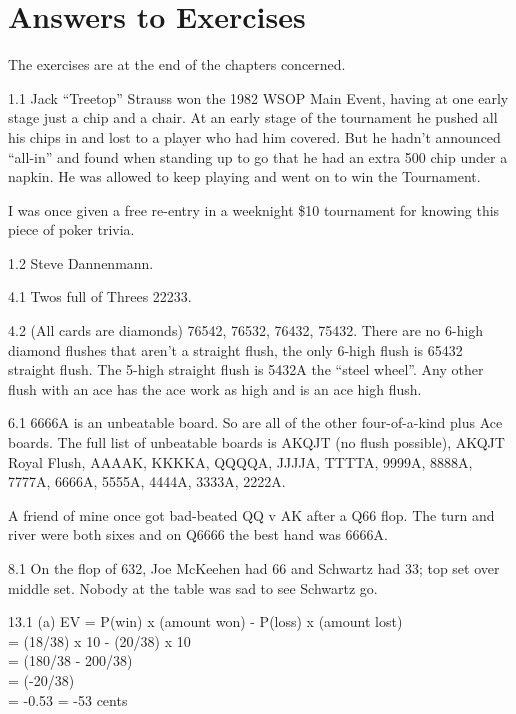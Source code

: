 \chapter{Answers to Exercises}

The exercises are at the end of the chapters concerned.


1.1 Jack ``Treetop'' Strauss won the 1982 WSOP Main Event,
having at one early stage just a chip and a chair. At an early
stage of the tournament he pushed all his chips in and lost to a
player who had him covered. But he hadn't announced ``all-in'' and
found when standing up to go that he had an extra 500 chip under a
napkin. He was allowed to keep playing and went on to win the
Tournament.

I was once given a free re-entry in a weeknight \$10 tournament for
knowing this piece of poker trivia.

1.2 Steve Dannenmann.


4.1 Twos full of Threes 22233.

4.2 (All cards are diamonds) 76542, 76532, 76432, 75432. There are no
6-high diamond flushes that aren't a straight flush, the only 6-high
flush is 65432 straight flush. The 5-high straight flush is 5432A the
``steel wheel''. Any other flush with an ace has the ace work as high
and is an ace high flush.

6.1 6666A is an unbeatable board. So are all of the other
four-of-a-kind plus Ace boards. The full list of unbeatable boards is
AKQJT (no flush possible), AKQJT Royal Flush, AAAAK, KKKKA, QQQQA,
JJJJA, TTTTA, 9999A, 8888A, 7777A, 6666A, 5555A, 4444A, 3333A, 2222A.

A friend of mine once got bad-beated QQ v AK after a Q66 flop. The
turn and river were both sixes and on Q6666 the best hand was 6666A.

8.1 On the flop of 632, Joe McKeehen had 66 and Schwartz had 33; top
set over middle set. Nobody at the table was sad to see Schwartz go.

13.1 (a) EV = P(win) x (amount won) - P(loss) x (amount lost) \\
= (18/38) x 10 - (20/38) x 10 \\
= (180/38 - 200/38) \\
= (-20/38) \\
= -0.53 = -53 cents

